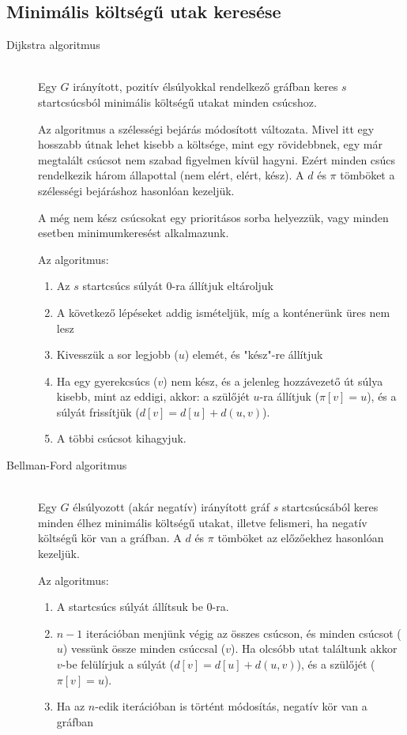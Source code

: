 \documentclass[margin=0px]{article}
\begin{document}
\subsection{Minimális költségű utak keresése}
\begin{description}
    \item[Dijkstra algoritmus] \hfill \\
        Egy $G$ irányított, pozitív élsúlyokkal rendelkező gráfban keres $s$ startcsúcsból minimális költségű utakat minden csúcshoz.

        Az algoritmus a szélességi bejárás módosított változata. Mivel itt egy hosszabb útnak lehet kisebb a költsége, mint egy rövidebbnek, egy már megtalált csúcsot nem szabad figyelmen kívül hagyni. Ezért minden csúcs rendelkezik három állapottal (nem elért, elért, kész). A $d$ és $\pi$ tömböket a szélességi bejáráshoz hasonlóan kezeljük.

        A még nem kész csúcsokat egy prioritásos sorba helyezzük, vagy minden esetben minimumkeresést alkalmazunk.

        Az algoritmus:
        \begin{enumerate}
            \item Az $s$ startcsúcs súlyát 0-ra állítjuk eltároljuk
            \item A következő lépéseket addig ismételjük, míg a konténerünk üres nem lesz
            \item Kivesszük a sor legjobb ($u$) elemét, és "kész"-re állítjuk
            \item Ha egy gyerekcsúcs ($v$) nem kész, és a jelenleg hozzávezető út súlya kisebb, mint az eddigi, akkor: a szülőjét $u$-ra állítjuk ($\pi[v] = u$), és a súlyát frissítjük ($d[v] = d[u]+d(u,v)$).
            \item A többi csúcsot kihagyjuk.
        \end{enumerate}

    \item[Bellman-Ford algoritmus] \hfill \\
        Egy $G$ élsúlyozott (akár negatív) irányított gráf $s$ startcsúcsából keres minden élhez minimális költségű utakat, illetve felismeri, ha negatív költségű kör van a gráfban. A $d$ és $\pi$ tömböket az előzőekhez hasonlóan kezeljük.

        Az algoritmus:
        \begin{enumerate}
            \item A startcsúcs súlyát állítsuk be 0-ra.
            \item $n-1$ iterációban menjünk végig az összes csúcson, és minden csúcsot ($u$) vessünk össze minden csúccsal ($v$). Ha olcsóbb utat találtunk akkor $v$-be felülírjuk a súlyát ($d[v] = d[u]+d(u,v)$), és a szülőjét ($\pi[v] = u$).
            \item Ha az $n$-edik iterációban is történt módosítás, negatív kör van a gráfban
        \end{enumerate}
\end{description}
\end{document}
